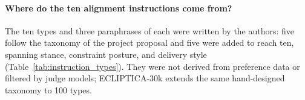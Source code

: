 



\paragraph{Where do the ten alignment instructions come from?}
The ten types and three paraphrases of each were written by the authors: five follow the taxonomy of the project proposal and five were added to reach ten, spanning stance, constraint posture, and delivery style (Table~\ref{tab:instruction_types}).
They were not derived from preference data or filtered by judge models; ECLIPTICA-30k extends the same hand-designed taxonomy to 100 types.

